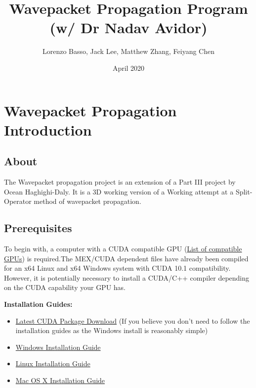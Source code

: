\documentclass[11pt,letterpaper]{article}
\title{Wavepacket Propagation Program (w/ Dr Nadav Avidor)}
\author{Lorenzo Basso, Jack Lee, Matthew Zhang, Feiyang Chen}
\date{April 2020}
\renewcommand{\\}{\bigskip}
\begin{document}
\maketitle

\tableofcontents


\pagestyle{fancy}
\renewcommand{\subsectionmark}[1]{\markright{#1}{}}
\fancyfoot[C]{\thepage}%
\fancyhead[L]{\leftmark}
\fancyhead[R]{\rightmark}

\newpage

\section{Wavepacket Propagation Introduction}
\subsection{About}

The Wavepacket propagation project is an extension of a Part III project by Ocean Haghighi-Daly. It is a 3D working version of a Working attempt at a Split-Operator method of wavepacket propagation. 


\subsection{Prerequisites}

To begin with, a computer with a CUDA compatible GPU (\href{https://developer.nvidia.com/cuda-gpus#compute}{List of compatible GPUs}) is required.The MEX/CUDA dependent files have already been compiled for an x64 Linux and x64 Windows system with CUDA 10.1 compatibility. However, it is potentially necessary to install a CUDA/C++ compiler depending on the CUDA capability your GPU has.\\

\textbf{Installation Guides:}

\begin{itemize}
    \item \href{https://developer.nvidia.com/cuda-downloads?target_os=Windows&target_arch=x86_64}{Latest CUDA Package Download} (If you believe you don't need to follow the installation guides as the Windows install is reasonably simple)
    \item \href{https://docs.nvidia.com/cuda/cuda-installation-guide-microsoft-windows/index.html}{Windows Installation Guide}
    \item \href{https://docs.nvidia.com/cuda/cuda-installation-guide-linux/index.html}{Linux Installation Guide}
    \item \href{https://docs.nvidia.com/cuda/cuda-installation-guide-mac-os-x/index.html}{Mac OS X Installation Guide}
\end{itemize}
\end{document}
